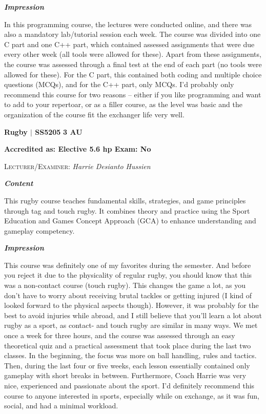 {\large{\textbf{\textit{Impression}}}}
\vspace{-0.25cm}

In this programming course, the lectures were conducted online, and there was also a mandatory lab/tutorial session each week. The course was divided into one C part and one C++ part, which contained assessed assignments that were due every other week (all tools were allowed for these). Apart from these assignments, the course was assessed through a final test at the end of each part (no tools were allowed for these). For the C part, this contained both coding and multiple choice questions (MCQs), and for the C++ part, only MCQs. I'd probably only recommend this course for two reasons -- either if you like programming and want to add to your repertoar, or as a filler course, as the level was basic and the organization of the course fit the exchanger life very well.

\vspace{-0.3cm}
\hrulefill

{\large{\textbf{Rugby $\vert$ SS5205} \hfill \textbf{3 AU}}}

\vspace{-0.3cm}
\textbf{Accredited as: Elective 5.6 hp \hfill Exam: No}

{\large{\textsc{Lecturer/Examiner:} \textit{Harrie Desianto Hussien}}} \vspace{0.25cm}

{\large{\textbf{\textit{Content}}}} 
\vspace{-0.25cm}

This rugby course teaches fundamental skills, strategies, and game principles through tag and touch rugby. It combines theory and practice using the Sport Education and Games Concept Approach (GCA) to enhance understanding and gameplay competency.

{\large{\textbf{\textit{Impression}}}}
\vspace{-0.25cm}

This course was definitely one of my favorites during the semester. And before you reject it due to the physicality of regular rugby, you should know that this was a non-contact course (touch rugby). This changes the game a lot, as you don't have to worry about receiving brutal tackles or getting injured (I kind of looked forward to the physical aspects though). However, it was probably for the best to avoid injuries while abroad, and I still believe that you'll learn a lot about rugby as a sport, as contact- and touch rugby are similar in many ways. We met once a week for three hours, and the course was assessed through an easy theoretical quiz and a practical assessment that took place during the last two classes. In the beginning, the focus was more on ball handling, rules and tactics. Then, during the last four or five weeks, each lesson essentially contained only gameplay with short breaks in between. Furthermore, Coach Harrie was very nice, experienced and passionate about the sport. I'd definitely recommend this course to anyone interested in sports, especially while on exchange, as it was fun, social, and had a minimal workload.


